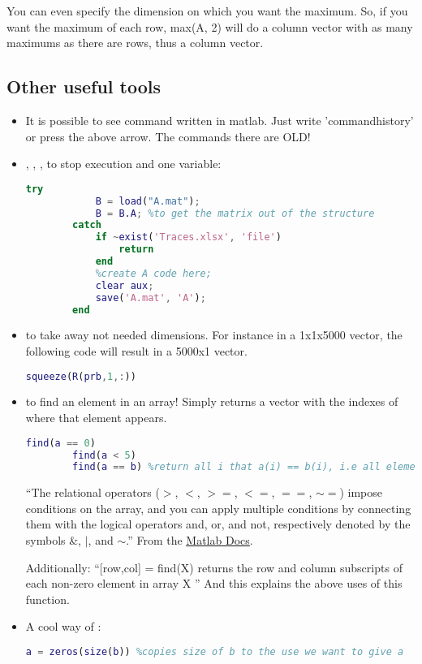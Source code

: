 You can even specify the dimension on which you want the maximum. So, if you want the maximum of each row, max(A, 2) will do a column vector with as many maximums as there are rows, thus a column vector.




\subsection{Other useful tools}

\begin{itemize}
	\item It is possible to see  command written in matlab. Just write 'commandhistory' or press the above arrow. The commands there are OLD!

	\item {}, , ,  to stop execution and  one variable:
	\begin{lstlisting}[language=matlab]
        try 
            B = load("A.mat");
            B = B.A; %to get the matrix out of the structure
        catch
            if ~exist('Traces.xlsx', 'file')
                return
            end
            %create A code here;
            clear aux;
            save('A.mat', 'A');
        end
    \end{lstlisting}
    \item {} to take away not needed dimensions. For instance in a 1x1x5000 vector, the following code will result in a 5000x1 vector.
    \begin{lstlisting}[language = matlab]
        squeeze(R(prb,1,:))
    \end{lstlisting}
    \item {} to find an element in an array! Simply returns a vector with the indexes of where that element appears.
    \begin{lstlisting}[language=matlab]
        find(a == 0)
        find(a < 5)
        find(a == b) %return all i that a(i) == b(i), i.e all elements that are in both vectors
    \end{lstlisting}
    ``The relational operators ($>$, $<$, $>=$, $<=$, $==$, $\sim =$) impose conditions on the array, and you can apply multiple conditions by connecting them with the logical operators and, or, and not, respectively denoted by the symbols \&, $|$, and $\sim$.'' From the \href{https://nl.mathworks.com/help/matlab/matlab_prog/find-array-elements-that-meet-a-condition.html}{\ul{Matlab Docs}}.
    \par Additionally: ``[row,col] = find(X) returns the row and column subscripts of each non-zero element in array X '' And this explains the above uses of this function.
    \item A cool way of :
    \begin{lstlisting}[language=matlab]
        a = zeros(size(b)) %copies size of b to the use we want to give a
    \end{lstlisting}
    

\end{itemize}
